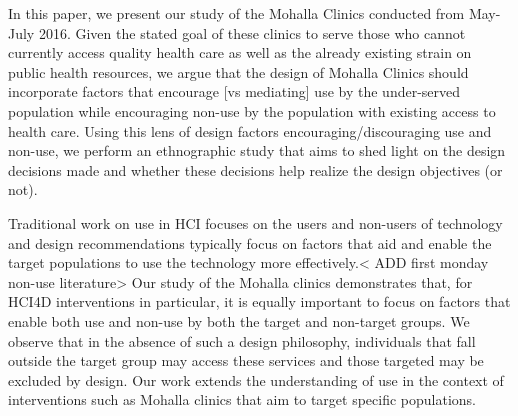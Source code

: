 In this paper, we present our study of the Mohalla Clinics conducted from May-July 2016. Given the stated goal of these clinics to serve those who cannot currently access quality health care as well as the already existing strain on public health resources, we argue that the design of Mohalla Clinics should incorporate factors that encourage [vs mediating] use by the under-served population while encouraging non-use by the population with existing access to health care. Using this lens of design factors encouraging/discouraging use and non-use, we perform an ethnographic study that aims to shed light on the design decisions made and whether these decisions help realize the design objectives (or not). 

Traditional work on use in HCI focuses on the users and non-users of technology and design recommendations typically focus on factors that aid and enable the target populations to use the technology more effectively.< ADD first monday non-use literature> Our study of the Mohalla clinics demonstrates that, for HCI4D interventions in particular, it is equally important to focus on factors that enable both use and non-use by both the target and non-target groups. %
We observe that in the absence of such a design philosophy, individuals that fall outside the target group may access these services and those targeted may be excluded by design. Our work extends the understanding of use in the context of interventions such as Mohalla clinics that aim to target specific populations.


\begin{comment} 
In this paper, we present our study of the Mohalla Clinics conducted from May-July 2016. Our use of ethnographic methods aims to shed light on the design objectives of this initiative and how these were realized (or not). By discussing the findings from our observations and interviews, we draw attention to the target users of this initiative and the use that resulted from this intervention, highlighting the challenges of (designing such programs).
While traditional work on use in HCI focuses on the users and non-users of technology and design recommendations follow initial assumptions regarding these groups \cite{?}, our study of the Mohalla clinics demonstrates that the distinction between use and non-use can be unclear. Individuals that fall outside the target group may access these services \cite{baumer2015usees} and those targeted may be excluded by design. Our paper draws upon the existing body of literature to extend the understanding of use in the context of interventions such as Mohalla clinics that aim to target specific populations.
\end{comment}